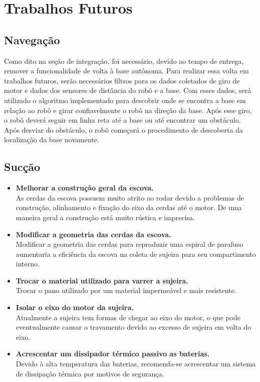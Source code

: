 \section{Trabalhos Futuros}

\subsection{Navegação}

Como dito na seção de integração, foi necessário, devido ao tempo de entrega, remover a funcionalidade de volta à base autônoma. Para realizar essa volta em trabalhos futuros, serão necessários filtros para os dados coletados de giro de motor e dados dos sensores de distância do robô e a base. Com esses dados, será utilizado o algoritmo implementado para descobrir onde se encontra a base em relação ao robô e girar confiavelmente o robô na direção da base. Após esse giro, o robô deverá seguir em linha reta até a base ou até encontrar um obstáculo. Após desviar do obstáculo, o robô começará o procedimento de descoberta da localização da base novamente.

\subsection{Sucção}

\begin{itemize}
   \item \textbf{Melhorar a construção geral da escova.}\\
    As cerdas da escova possuem muito atrito ao rodar devido a problemas de construção, alinhamento e fixação do eixo da cerdas até o motor. De uma maneira geral a construção está muito rústica e imprecisa.

    \item \textbf{Modificar a geometria das cerdas da escova.}\\
    Modificar a geometria das cerdas para reproduzir uma espiral de parafuso aumentaria a eficiência da escova na coleta de sujeira para seu compartimento interno.


  \item \textbf{Trocar o material utilizado para varrer a sujeira.}\\
  Trocar o pano utilizado por um material impermeável e mais resistente.


  \item \textbf{Isolar o eixo do motor da sujeira.}\\
  Atualmente a sujeira tem formas de chegar ao eixo do motor, o que pode eventualmente causar o travamento devido ao excesso de sujeira em volta do eixo.


  \item \textbf{Acrescentar um dissipador térmico passivo as baterias.}\\
  Devido à alta temperatura das baterias, recomenda-se acrescentar um sistema de dissipação térmica por motivos de segurança.

\end{itemize}
